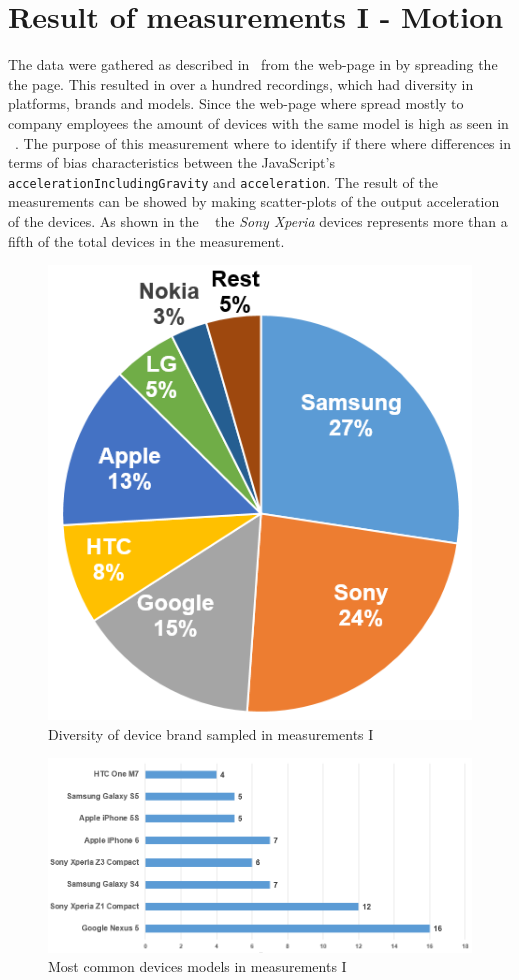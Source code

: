 \section{Result of measurements I  - Motion}\label{res:testI}
The data were gathered as described in~ from the web-page in  by spreading the the page. This resulted in over a hundred recordings, which had diversity in platforms, brands and models. Since the web-page where spread mostly to company employees the amount of devices with the same model is high as seen in ~.
The purpose of this measurement where to identify if there where differences in terms of bias characteristics between the JavaScript's \texttt{accelerationIncludingGravity} and \texttt{acceleration}. The result of the measurements can be showed by making scatter-plots of the output acceleration of the devices. As shown in the ~ the \textit{Sony Xperia} devices represents more than a fifth of the total devices in the measurement. 
\begin{figure}[H]
	\centering
	\includegraphics[scale=0.3]{img/measure1-brand}
	\caption{Diversity of device brand sampled in measurements I}
	\label{fig:measure1-brand}
\end{figure}
\begin{figure}[H]
	\centering
	\includegraphics[scale=0.5]{img/measure1-devices}
	\caption{Most common devices models in measurements I}
	\label{fig:measure1-topDevices}
\end{figure}

